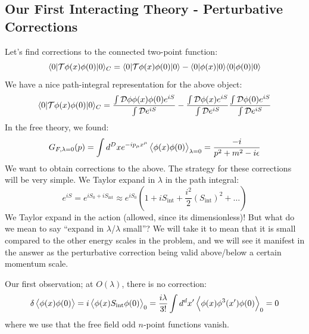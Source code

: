\subsection{Our First Interacting Theory - Perturbative Corrections}
Let's find corrections to the connected two-point function:
\begin{equation}
    \langle 0 \rvert\mathcal{T}\phi(x)\phi(0)\lvert 0 \rangle_C = \langle 0 \rvert\mathcal{T}\phi(x)\phi(0)\lvert 0 \rangle - \langle 0 \rvert\phi(x)\lvert 0 \rangle\langle 0 \rvert\phi(0)\lvert 0 \rangle
\end{equation}
We have a nice path-integral representation for the above object:
\begin{equation}
    \langle 0 \rvert\mathcal{T}\phi(x)\phi(0)\lvert 0 \rangle_C = \frac{\int \mathcal{D}\phi \phi(x)\phi(0)e^{iS}}{\int \mathcal{D}e^{iS}} - \frac{\int \mathcal{D}\phi(x)e^{iS}}{\int \mathcal{D}e^{iS}}\frac{\int \mathcal{D}\phi(0)e^{iS}}{\int \mathcal{D}e^{iS}}
\end{equation}
In the free theory, we found:
\begin{equation}
    G_{F, \lambda=0}(p) = \int d^Dx e^{-ip_\mu x^\mu}\left< \phi(x)\phi(0) \right>_{\lambda=0} = \frac{-i}{p^2 + m^2 - i\epsilon}
\end{equation}
We want to obtain corrections to the above. The strategy for these corrections will be very simple. We Taylor expand in $\lambda$ in the path integral:
\begin{equation}
    e^{iS} = e^{iS_0 + iS_{\text{int}}} \approx e^{iS_0}\left(1 + iS_{\text{int}} + \frac{i^2}{2}(S_{\text{int}})^2 + \ldots \right)
\end{equation}
We Taylor expand in the action (allowed, since its dimensionless)! But what do we mean to say ``expand in $\lambda$/$\lambda$ small''? We will take it to mean that it is small compared to the other energy scales in the problem, and we will see it manifest in the answer as the perturbative correction being valid above/below a certain momentum scale.

Our first observation; at $O(\lambda)$, there is no correction:
\begin{equation}
    \delta \left< \phi(x)\phi(0) \right> = i\left< \phi(x)S_{\text{int}}\phi(0) \right>_0 = \frac{i\lambda}{3!}\int d^dx'\left< \phi(x)\phi^3(x')\phi(0) \right>_0 = 0
\end{equation}
where we use that the free field odd $n$-point functions vanish.

